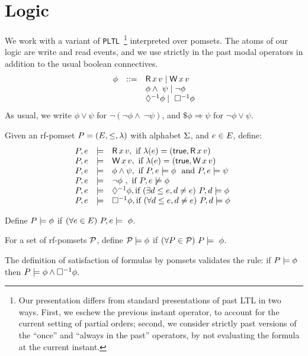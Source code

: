 \section{Logic}
\label{sec:logic}

\newcommand{\since}[2]{{#1} \  {\tt  S } \  {#2}}
\newcommand{\pLTL}{{\tt PLTL}}
\newcommand{\once}{\Diamond^{-1}}
\newcommand{\pastalways}{\Box^{-1}}
\newcommand{\afo}{\phi}
\newcommand{\bfo}{\psi}
\newcommand{\mods}{\tt Models}



We work with a variant of \pLTL\ \footnote{ Our presentation differs from standard presentations of past LTL\citet{Lichtenstein:1985:GP:648065.747612} in two ways.  First, we eschew the previous instant operator, to account for the current setting of partial orders; second, we consider strictly past  versions of the ``once'' and ``always in the past'' operators, by not evaluating the formula at the current instant.}   interpreted over pomsets.  The atoms of our logic are write and read events, and we use strictly in the past modal operators in addition to the usual boolean connectives.
\[
\begin{array}{lrl}
 \afo &::=&\DR{\aLoc}{\aVal}  \mid \DW\aLoc\aVal \\
      &&  \afo \wedge\ \bfo \mid \neg \afo  \\
      && \once\afo \mid\ \pastalways\afo
\end{array} 
\]
As usual, we write $\afo\vee\bfo$ for $\neg(\neg \afo \wedge\ \neg \bfo)$, and $\$\afo \Rightarrow \bfo$ for $\neg \afo \vee \bfo$.  

\begin{definition} [Satisfaction]
Given an rf-pomset  $P= (E, {\le}, \lambda)$ with alphabet $\Sigma$, and  $e \in E$, define:
\[
\begin{array}{lrl}
 \aPS,\aEv & \models& \DR{\aLoc}{\aVal}, \ \mbox{if } \labelling(\aEv) =  (\TRUE, \DR{\aLoc}{\aVal}) \\
\aPS,\aEv &\models& \DW{\aLoc}{\aVal}, \ \mbox{if } \labelling(\aEv) =  (\TRUE, \DW{\aLoc}{\aVal}) \\
\aPS,\aEv &\models&  \afo\wedge\bfo, \ \mbox{if } \aPS,\aEv \models  \afo\ \mbox{ and } \aPS,\aEv \models  \bfo\  \\
\aPS,\aEv &\models&  \neg\afo\ , \ \mbox{if } \aPS,\aEv \not\models \afo \\
 \aPS,\aEv &\models& \once\afo, \mbox{if } (\exists \bEv \le \aEv, \bEv\not=\aEv) \  \aPS,\bEv \models \afo\  \\
 \aPS,\aEv &\models& \pastalways\afo, \mbox{if } (\forall \bEv \le \aEv, \bEv\not=\aEv) \  \aPS,\bEv \models \afo\ 
\end{array} 
\]

Define $\aPS \models \afo$ if $(\forall \aEv \in \Event) \ \aPS,\aEv  \models\ \afo$.

For a set of rf-pomsets $\mathcal{P}$, define $\aPSS\models \afo$ if $(\forall \aPS \in \aPSS) \ \aPS \models\ \afo$.
\end{definition}
The definition of satisfaction of formulas by pomsets validates the rule: if $ \aPS \models \afo$ then $\aPS \models \afo \wedge \pastalways\afo$.  


